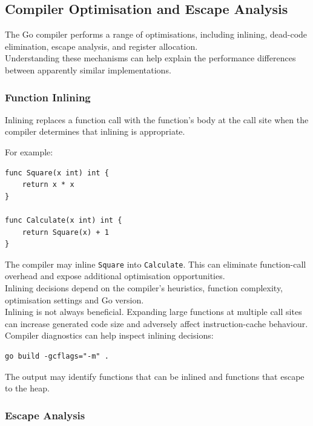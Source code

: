 \subsection{Compiler Optimisation and Escape Analysis}

The Go compiler performs a range of optimisations, including inlining, dead-code elimination, escape analysis, and register allocation.\\

Understanding these mechanisms can help explain the performance differences between apparently similar implementations.

\subsubsection{Function Inlining}

Inlining replaces a function call with the function's body at the call site when the compiler determines that inlining is appropriate.

For example:

\begin{lstlisting}
func Square(x int) int {
    return x * x
}

func Calculate(x int) int {
    return Square(x) + 1
}
\end{lstlisting}

The compiler may inline \texttt{Square} into \texttt{Calculate}. This can eliminate function-call overhead and expose additional optimisation opportunities.\\

Inlining decisions depend on the compiler's heuristics, function complexity, optimisation settings and Go version.\\

Inlining is not always beneficial. Expanding large functions at multiple call sites can increase generated code size and adversely affect instruction-cache behaviour.\\

Compiler diagnostics can help inspect inlining decisions:

\begin{lstlisting}
go build -gcflags="-m" .
\end{lstlisting}

The output may identify functions that can be inlined and functions that escape to the heap.

\subsubsection{Escape Analysis}

